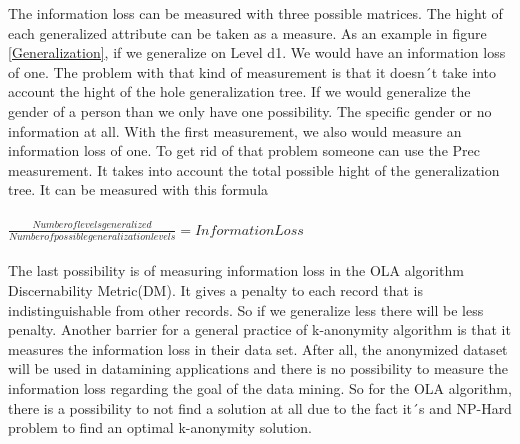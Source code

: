 \documentclass{llncs}
\begin{document}
The information loss can be measured with three possible matrices. The hight of each generalized attribute can be taken as a measure. As an example in figure \ref{Generalization}, if we generalize on Level d1. We would have an information loss of one. The problem with that kind of measurement is that it doesn´t take into account the hight of the hole generalization tree. If we would generalize the gender of a person than we only have one possibility. The specific gender or no information at all. With the first measurement, we also would measure an information loss of one. To get rid of that problem someone can use the Prec measurement. It takes into account the total possible hight of the generalization tree. It can be measured with this formula\\\\ $\frac{Number of levels generalized}{Number of possible generalization levels} = Information Loss$\\\\The last possibility is of measuring information loss in the OLA algorithm Discernability Metric(DM). It gives a penalty to each record that is indistinguishable from other records. So if we generalize less there will be less penalty. Another barrier for a general practice of k-anonymity algorithm is that it measures the information loss in their data set. After all, the anonymized dataset will be used in datamining applications and there is no possibility to measure the information loss regarding the goal of the data mining. So for the OLA algorithm, there is a possibility to not find a solution at all due to the fact it´s and NP-Hard problem to find an optimal k-anonymity solution\cite{el2009globally}.
\end{document}
